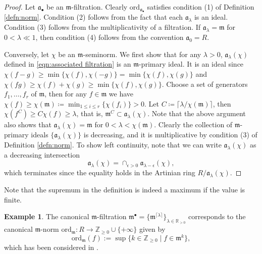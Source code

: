 \documentclass[11pt, leqno]{amsart}%
\theoremstyle{plain}
\theoremstyle{definition}
\newtheorem{example}[theorem]{Example}
\theoremstyle{remark}
\newcommand{\bR}{\mathbb{R}}
\newcommand{\bZ}{\mathbb{Z}}
\newcommand{\fa}{\mathfrak{a}}
\newcommand{\fm}{\mathfrak{m}}
\newcommand{\ord}{\mathrm{ord}}
\numberwithin{equation}{section}
\begin{document}
\begin{proof}
    Let $\fa_\bullet$ be an $\fm$-filtration. Clearly $\ord_{\fa_\bullet}$ satisfies condition (1) of Definition \ref{defn:norm}. Condition (2) follows from the fact that each $\fa_\lambda$ is an ideal. Condition (3) follows from the multiplicativity of a filtration. If $\fa_\lambda=\fm$ for $0<\lambda\ll 1$, then condition (4) follows from the convention $\fa_0=R$.
	
    Conversely, let $\chi$ be an $\fm$-seminorm. We first show that for any $\lambda>0$, $\fa_\lambda(\chi)$ defined in \eqref{eqn:associated filtration} is an $\fm$-primary ideal. It is an ideal since $\chi(f-g)\ge\min\{\chi(f),\chi(-g)\}=\min\{\chi(f),\chi(g)\}$ and $\chi(fg)\ge\chi(f)+\chi(g)\ge\min\{\chi(f),\chi(g)\}$. Choose a set of generators $f_1,\ldots,f_r$ of $\fm$, then for any $f\in\fm$ we have $\chi(f)\ge \chi(\fm)\coloneqq\min_{1\le i\le r}\{\chi(f_i)\}>0$. Let $C\coloneqq\lceil\lambda/\chi(\fm)\rceil$, then $\chi(f^C)\ge C\chi(f)\ge \lambda$, that is, $\fm^C\subset\fa_\lambda(\chi)$. Note that the above argument also shows that $\fa_\lambda(\chi)=\fm$ for $0<\lambda<\chi(\fm)$. Clearly the collection of $\fm$-primary ideals $\{\fa_\lambda(\chi)\}$ is decreasing, and it is multiplicative by condition (3) of Definition \ref{defn:norm}. To show left continuity, note that we can write $\fa_\lambda(\chi)$ as a decreasing intersection 
    \[
        \fa_\lambda(\chi)=
        \cap_{\epsilon>0}\fa_{\lambda-\epsilon}(\chi),
    \]
    which terminates since the equality holds in the Artinian ring $R/\fa_\lambda(\chi)$.
\end{proof}


Note that the supremum in the definition is indeed a maximum if the value is finite.


\begin{example}
        The canonical $\fm$-filtration $\fm^\bullet=\{\fm^{\lceil \lambda \rceil}\}_{\lambda\in\bR_{>0}}$ corresponds to the canonical $\fm$-norm $\ord_\fm:R\to\bZ_{\ge 0}\cup\{+\infty\}$ given by
		\[
		\ord_\fm(f):=\sup\{k\in\bZ_{\ge 0}\mid f\in \fm^k\},
		\]
        which has been considered in \cite[Section 4]{BFJ14}.
	
\end{example}
\end{document}
